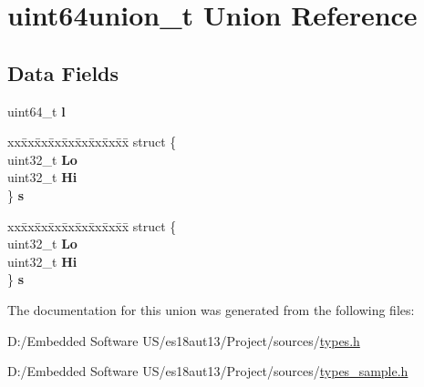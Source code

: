 \hypertarget{unionuint64union__t}{}\section{uint64union\+\_\+t Union Reference}
\label{unionuint64union__t}
\subsection*{Data Fields}
\begin{DoxyCompactItemize}
\item 
\hypertarget{unionuint64union__t_a2d5e8db071e91dd1ed90c03584facdfd}{}uint64\+\_\+t {\bfseries l}\label{unionuint64union__t_a2d5e8db071e91dd1ed90c03584facdfd}

\item 
\hypertarget{unionuint64union__t_a2a8bb1866777fd69d4c84bace41fce4b}{}\begin{tabbing}
xx\=xx\=xx\=xx\=xx\=xx\=xx\=xx\=xx\=\kill
struct \{\\
\>uint32\_t {\bfseries Lo}\\
\>uint32\_t {\bfseries Hi}\\
\} {\bfseries s}\label{unionuint64union__t_a2a8bb1866777fd69d4c84bace41fce4b}
\\

\end{tabbing}\item 
\hypertarget{unionuint64union__t_a562119bae752c14aa9f13f7ae6b44059}{}\begin{tabbing}
xx\=xx\=xx\=xx\=xx\=xx\=xx\=xx\=xx\=\kill
struct \{\\
\>uint32\_t {\bfseries Lo}\\
\>uint32\_t {\bfseries Hi}\\
\} {\bfseries s}\label{unionuint64union__t_a562119bae752c14aa9f13f7ae6b44059}
\\

\end{tabbing}\end{DoxyCompactItemize}


The documentation for this union was generated from the following files\+:\begin{DoxyCompactItemize}
\item 
D\+:/\+Embedded Software U\+S/es18aut13/\+Project/sources/\hyperlink{types_8h}{types.\+h}\item 
D\+:/\+Embedded Software U\+S/es18aut13/\+Project/sources/\hyperlink{types__sample_8h}{types\+\_\+sample.\+h}\end{DoxyCompactItemize}
